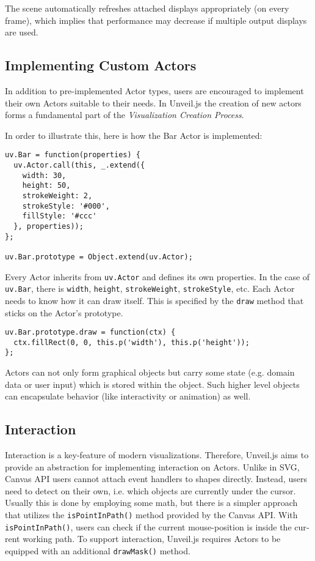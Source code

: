 \begin{english}
\SuperPar The scene automatically refreshes attached displays appropriately (on every frame), which implies that performance may decrease if multiple output displays are used.

\subsection{Implementing Custom Actors}

In addition to pre-implemented Actor types, users are encouraged to implement their own Actors suitable to their needs. In Unveil.js the creation of new actors forms a fundamental part of the \emph{Visualization Creation Process}.

\SuperPar In order to illustrate this, here is how the Bar Actor is implemented:

\begin{verbatim}
uv.Bar = function(properties) {
  uv.Actor.call(this, _.extend({
    width: 30,
    height: 50,
    strokeWeight: 2,
    strokeStyle: '#000',
    fillStyle: '#ccc'
  }, properties));
};

uv.Bar.prototype = Object.extend(uv.Actor);
\end{verbatim}

\SuperPar Every Actor inherits from \texttt{uv.Actor} and defines its own properties. In the case of \texttt{uv.Bar}, there is \texttt{width}, \texttt{height}, \texttt{strokeWeight}, \texttt{strokeStyle}, etc. Each Actor needs to know how it can draw itself. This is specified by the \texttt{draw} method that sticks on the Actor's prototype.

\begin{verbatim}
uv.Bar.prototype.draw = function(ctx) {
  ctx.fillRect(0, 0, this.p('width'), this.p('height'));
};
\end{verbatim}

\SuperPar Actors can not only form graphical objects but carry some state (e.g. domain data or user input) which is stored within the object. Such higher level objects can encapsulate behavior (like interactivity or animation) as well.


\subsection{Interaction}

Interaction is a key-feature of modern visualizations. Therefore, Unveil.js aims to provide an abstraction for implementing interaction on Actors. Unlike in SVG, Canvas API users cannot attach event handlers to shapes directly. Instead, users need to detect on their own, i.e. which objects are currently under the cursor. Usually this is done by employing some math, but there is a simpler approach that utilizes the \texttt{isPointInPath()} method provided by the Canvas API. With \texttt{isPointInPath()}, users can check if the current mouse-position is inside the current working path. To support interaction, Unveil.js requires Actors to be equipped with an additional \texttt{drawMask()} method.


\end{english}
